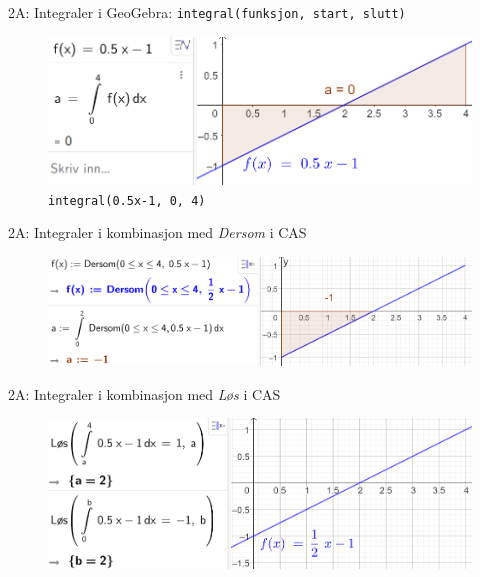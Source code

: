 \blueheader
\begin{frame}[fragile]{2A: Integraler i GeoGebra: \texttt{integral(funksjon, start, slutt)}}
\begin{figure}
    \centering
    \includegraphics[width=\linewidth]{R2-K2A-11.png}
    \caption{\texttt{integral(0.5x-1, 0, 4)}}
\end{figure}
\end{frame}

\blueheader
\begin{frame}[fragile]{2A: Integraler i kombinasjon med \emph{Dersom} i CAS}
\begin{figure}
    \centering
    \includegraphics[width=\linewidth]{R2-K2A-13.png}
\end{figure}
\end{frame}

\blueheader
\begin{frame}[fragile]{2A: Integraler i kombinasjon med \emph{Løs} i CAS}
\begin{figure}
    \centering
    \includegraphics[width=\linewidth]{R2-K2A-12.png}
\end{figure}
\end{frame}

